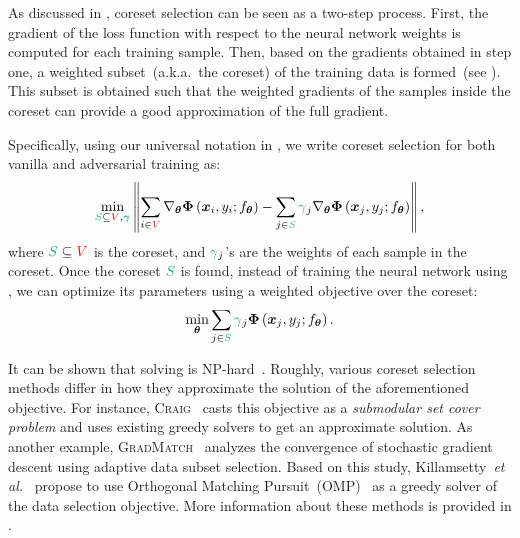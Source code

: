 \documentclass[runningheads]{llncs}
\newcommand{\norm}[1]{\left\lVert#1\right\rVert}
\newcommand{\etal}{\textit{et al.}}
\begin{document}
As discussed in , coreset selection can be seen as a two-step process.
First, the gradient of the loss function with respect to the neural network weights is computed for each training sample.
Then, based on the gradients obtained in step one, a weighted subset~(a.k.a.~the coreset) of the training data is formed~(see ).
This subset is obtained such that the weighted gradients of the samples inside the coreset can provide a good approximation of the full gradient.

Specifically, using our universal notation in , we write coreset selection for both vanilla and adversarial training as:
\begin{equation}\label{eq:gradient_app_coreset}
	\min_{\textcolor{mygreen}{S} \subseteq \textcolor{red}{V}, \textcolor{mygreen}{\boldsymbol{\gamma}}} \norm{\sum_{i \in \textcolor{red}{V}} \nabla_{\boldsymbol{\theta}}\boldsymbol{\Phi} \left(\boldsymbol{x}_{i}, y_{i}; f_{\boldsymbol{\theta}}\right)-\sum_{j \in \textcolor{mygreen}{S}} \textcolor{mygreen}{\gamma}_{j}\nabla_{\boldsymbol{\theta}}\boldsymbol{\Phi} \left(\boldsymbol{x}_{j}, y_{j}; f_{\boldsymbol{\theta}}\right)},
\end{equation}
where $\textcolor{mygreen}{S} \subseteq \textcolor{red}{V}$ is \textcolor{mygreen}{the coreset}, and $\textcolor{mygreen}{\gamma}_{j}$'s are \textcolor{mygreen}{the weights} of each sample in the coreset.
Once the coreset $\textcolor{mygreen}{S}$ is found, instead of training the neural network using , we can optimize its parameters using a weighted objective over the coreset:
\begin{equation}\label{eq:nn_training_objective_coreset}
    \min_{\boldsymbol{\theta}} \sum_{j \in \textcolor{mygreen}{S}} \textcolor{mygreen}{\gamma}_{j} \boldsymbol{\Phi} \left(\boldsymbol{x}_{j}, y_{j}; f_{\boldsymbol{\theta}}\right).
\end{equation}

It can be shown that solving  is NP-hard~\cite{mirzasoleiman2020craig,mirzasoleiman2020crust}.
Roughly, various coreset selection methods differ in how they approximate the solution of the aforementioned objective.
For instance, \textsc{Craig}~\cite{mirzasoleiman2020craig} casts this objective as a \textit{submodular set cover problem} and uses existing greedy solvers to get an approximate solution.
As another example, \textsc{GradMatch}~\cite{killamsetty2021gradmatch} analyzes the convergence of stochastic gradient descent using adaptive data subset selection.
Based on this study, Killamsetty~\etal~\cite{killamsetty2021gradmatch} propose to use Orthogonal Matching Pursuit~(OMP)~\cite{pati1992omp,elenberg2016restricted} as a greedy solver of the data selection objective.
More information about these methods is provided in .
\end{document}
